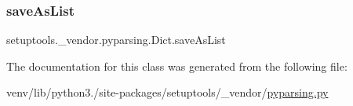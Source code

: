 \subsubsection{\texorpdfstring{save\+As\+List}{saveAsList}}
{\footnotesize\ttfamily setuptools.\+\_\+vendor.\+pyparsing.\+Dict.\+save\+As\+List}



The documentation for this class was generated from the following file\+:\begin{DoxyCompactItemize}
\item 
venv/lib/python3./site-\/packages/setuptools/\+\_\+vendor/\hyperlink{setuptools_2__vendor_2pyparsing_8py}{pyparsing.\+py}\end{DoxyCompactItemize}
